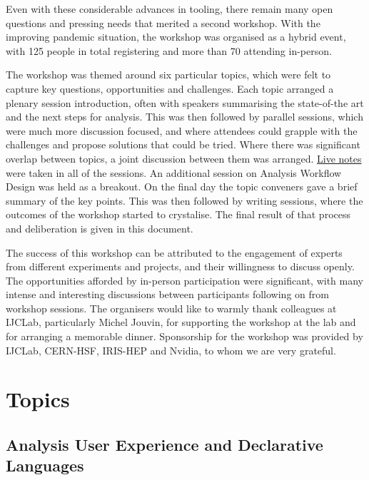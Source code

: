 \documentclass[a4paper,11pt]{article}
\begin{document}
Even with these considerable advances in tooling, there remain many open
questions and pressing needs that merited a second workshop. With the
improving pandemic situation, the workshop was organised as a hybrid
event, with 125 people in total registering and more than 70 attending
in-person.

The workshop was themed around six particular topics, which were felt to
capture key questions, opportunities and challenges. Each topic arranged
a plenary session introduction, often with speakers summarising the
state-of-the art and the next steps for analysis. This was then followed
by parallel sessions, which were much more discussion focused, and where
attendees could grapple with the challenges and propose solutions that
could be tried. Where there was significant overlap between topics, a
joint discussion between them was arranged.
\href{https://docs.google.com/document/d/17gPx0eKODpYfJwwler4p-9mR8KllISbDy_LlgOA9tfk/edit?usp=sharing}{{Live
notes}} were taken in all of the sessions. An additional session on
Analysis Workflow Design was held as a breakout. On the final day the
topic conveners gave a brief summary of the key points. This was then
followed by writing sessions, where the outcomes of the workshop started
to crystalise. The final result of that process and deliberation is
given in this document.

The success of this workshop can be attributed to the engagement of
experts from different experiments and projects, and their willingness
to discuss openly. The opportunities afforded by in-person participation
were significant, with many intense and interesting discussions between
participants following on from workshop sessions. The organisers would
like to warmly thank colleagues at IJCLab, particularly Michel Jouvin,
for supporting the workshop at the lab and for arranging a memorable
dinner. Sponsorship for the workshop was provided by IJCLab, CERN-HSF,
IRIS-HEP and Nvidia, to whom we are very grateful.

\hypertarget{topics}{%
\section{Topics}\label{topics}}

\hypertarget{analysis-user-experience-and-declarative-languages}{%
\subsection{Analysis User Experience and Declarative
Languages}\label{analysis-user-experience-and-declarative-languages}}
\end{document}
